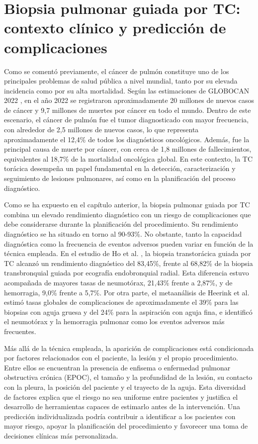 \section{Biopsia pulmonar guiada por TC: contexto clínico y predicción de complicaciones}

Como se comentó previamente, el cáncer de pulmón constituye uno de los principales problemas de salud pública a nivel mundial, tanto por su elevada incidencia como por su alta mortalidad. Según las estimaciones de GLOBOCAN 2022 \cite{Bray2024}, en el año 2022 se registraron aproximadamente 20 millones de nuevos casos de cáncer y 9,7 millones de muertes por cáncer en todo el mundo. Dentro de este escenario, el cáncer de pulmón fue el tumor diagnosticado con mayor frecuencia, con alrededor de 2,5 millones de nuevos casos, lo que representa aproximadamente el 12,4\% de todos los diagnósticos oncológicos. Además, fue la principal causa de muerte por cáncer, con cerca de 1,8 millones de fallecimientos, equivalentes al 18,7\% de la mortalidad oncológica global. En este contexto, la TC torácica desempeña un papel fundamental en la detección, caracterización y seguimiento de lesiones pulmonares, así como en la planificación del proceso diagnóstico.

Como se ha expuesto en el capítulo anterior, la biopsia pulmonar guiada por TC combina un elevado rendimiento diagnóstico con un riesgo de complicaciones que debe considerarse durante la planificación del procedimiento. Su rendimiento diagnóstico se ha situado en torno al 90-93\%. No obstante, tanto la capacidad diagnóstica como la frecuencia de eventos adversos pueden variar en función de la técnica empleada. En el estudio de Ho et al. \cite{Ho2023}, la biopsia transtorácica guiada por TC alcanzó un rendimiento diagnóstico del 83,45\%, frente al 68,82\% de la biopsia transbronquial guiada por ecografía endobronquial radial. Esta diferencia estuvo acompañada de mayores tasas de neumotórax, 21,43\% frente a 2,87\%, y de hemorragia, 9,0\% frente a 5,7\%. Por otra parte, el metaanálisis de Heerink et al. \cite{Heerink2017} estimó tasas globales de complicaciones de aproximadamente el 39\% para las biopsias con aguja gruesa y del 24\% para la aspiración con aguja fina, e identificó el neumotórax y la hemorragia pulmonar como los eventos adversos más frecuentes.

Más allá de la técnica empleada, la aparición de complicaciones está condicionada por factores relacionados con el paciente, la lesión y el propio procedimiento. Entre ellos se encuentran la presencia de enfisema o enfermedad pulmonar obstructiva crónica (EPOC), el tamaño y la profundidad de la lesión, su contacto con la pleura, la posición del paciente y el trayecto de la aguja. Esta diversidad de factores explica que el riesgo no sea uniforme entre pacientes y justifica el desarrollo de herramientas capaces de estimarlo antes de la intervención. Una predicción individualizada podría contribuir a identificar a los pacientes con mayor riesgo, apoyar la planificación del procedimiento y favorecer una toma de decisiones clínicas más personalizada.

